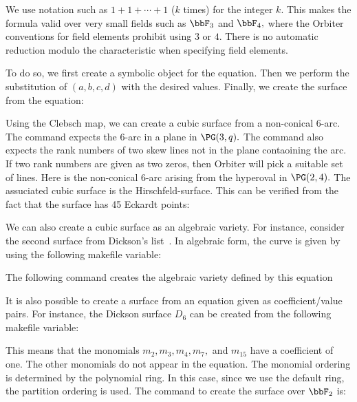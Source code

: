 We use notation such as $1+1+\cdots+1$ ($k$ times) 
for the integer $k$. This makes the formula valid 
over very small fields such as $\bbF_3$ and $\bbF_4,$
where the Orbiter conventions for field elements prohibit using $3$ or $4.$
There is no automatic reduction modulo 
the characteristic when specifying field elements.


\bigskip



To do so, we first create a symbolic object for the equation. 
Then we perform the substitution of $(a,b,c,d)$ with the desired values.
Finally, we create the surface from the equation:




\bigskip

Using the Clebsch map, we can create a cubic surface from a non-conical 6-arc. 
The command expects the 6-arc in a plane in $\PG(3,q).$ 
The command also expects the rank numbers of two skew lines not in the plane contaoining the arc. 
If two rank numbers are given as two zeros, then Orbiter will pick a suitable set of lines. 
Here is the non-conical 6-arc arising from the hyperoval in $\PG(2,4).$ 
The assuciated cubic surface is the Hirschfeld-surface. 
This can be verified from the fact that the surface has 
45 Eckardt points:







\bigskip


We can also create a cubic surface as an algebraic variety. 
For instance, consider the second surface  
from Dickson's list~\cite{Dickson15}.
In algebraic form, the curve is given by using the following makefile variable:


The following command creates the algebraic variety defined by this equation




\bigskip


It is also possible to create a surface from an equation given as coefficient/value pairs. 
For instance, the Dickson surface $D_6$ 
can be created from the following makefile variable:



This means that the monomials 
$m_2, m_3, m_4, m_7,$ and $m_{15}$ have a coefficient of one. 
The other monomials do not appear in the equation.
The monomial ordering is determined by the polynomial ring. 
In this case, since we use the default ring, the partition ordering is used.
The command to create the surface over $\bbF_2$ is:



\bigskip





